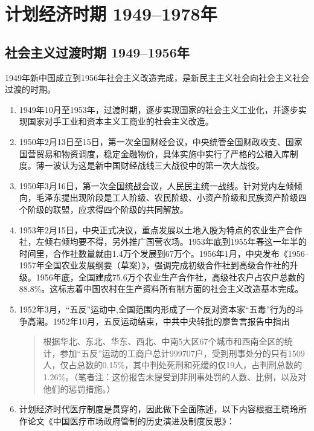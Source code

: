 \chapter{计划经济时期 1949--1978年}

\section{社会主义过渡时期 1949--1956年}
\label{sec:hongguodu}

1949年新中国成立到1956年社会主义改造完成，是新民主主义社会向社会主义社会过渡的时期。

\begin{enumerate}
\item 1949年10月至1953年，过渡时期，逐步实现国家的社会主义工业化，并逐步实现国家对手工业和资本主义工商业的社会主义改造。

\item 1950年2月13日至15日，第一次全国财经会议，中央统管全国财政收支、国家国营贸易和物资调度，稳定金融物价，具体实施中实行了严格的公粮入库制度。薄一波认为这是新中国财经战线三大战役中的第一次大战役。

\item 1950年3月16日，第一次全国统战会议，人民民主统一战线。针对党内左倾倾向，毛泽东提出现阶段是工人阶级、农民阶级、小资产阶级和民族资产阶级四个阶级的联盟，应求得四个阶级的共同解放。

\item 1953年2月15日，中央正式决议，重点发展以土地入股为特点的农业生产合作社，左倾右倾均要不得，另外推广国营农场。1953年底到1955年春这一年半的时间里，合作社数量就由1.4万个发展到67万个。1956年1月，中央发布《1956--1957年全国农业发展纲要（草案）》，强调完成初级合作社到高级合作社的升级。1956年底，全国建成75.6万个农业生产合作社，高级社农户占农户总数的88.8\%。这标志着中国农村在生产资料所有制方面的社会主义改造基本完成。

\item 1952年3月，“五反”运动中,全国范围内形成了一个反对资本家“五毒”行为的斗争高潮。1952年10月，五反运动结束，中共中央转批的廖鲁言报告中指出
  \begin{quotation}
    根据华北、东北、华东、西北、中南5大区67个城市和西南全区的统计，参加“五反”运动的工商户总计999707户，受到刑事处分的只有1509人，仅占总数的0.15\%，其中判处死刑和死缓的仅19人，占判刑总数的1.26\%。（笔者注：这份报告未提受到非刑事处罚的人数、比例，以及对他们的惩罚措施。）
  \end{quotation}

\item 计划经济时代医疗制度是贯穿的，因此做下全面陈述，以下内容根据王晓玲所作论文《中国医疗市场政府管制的历史演进及制度反思》\cite{yiliaoshi}：


\end{enumerate}

